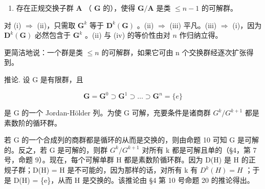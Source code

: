 \begin{enumerate}
\def\labelenumi{(\roman{enumi})}
\setcounter{enumi}{3}
\tightlist
\item
  存在正规交换子群 \(\mathbf{A}\) （ \(\mathbf{G}\) 的），使得 \(\mathbf{G} / \mathbf{A}\) 是类 \(\leqslant n - 1\) 的可解群。
\end{enumerate}

对 (i) \(\Rightarrow\) (ii)，只需取 \(\mathbf{G}^k\) 等于 \(\mathbf{D}^k (\mathbf{G})\) 。(ii) \(\Rightarrow\) (iii) 平凡。(iii) \(\Rightarrow\) (i)，因为 \(\mathbf{D}^k (\mathbf{G})\) 必然包含于 \(\mathbf{G}^k\) 。(ii) 与 (iv) 的等价性由对 \(n\) 作归纳立得。

更简洁地说：一个群是类 \(\leqslant n\) 的可解群，如果它可由 n 个交换群经逐次扩张得到。

推论. 设 G 是有限群，且

\[
\mathbf {G} = \mathbf {G} ^ {0} \supset \mathbf {G} ^ {1} \supset \dots \supset \mathbf {G} ^ {n} = \{e \}
\]

是 G 的一个 Jordan-Hölder 列。为使 G 可解，充要条件是诸商群 \(G^{k}/G^{k+1}\) 都是素数阶的循环群。

若 G 的一个合成列的商群都是循环的从而是交换的，则由命题 10 可知 G 是可解的。反之，若 G 是可解的，则群 \(G^{k}/G^{k+1}\) 对所有 k 都是可解且单的（§4，第 7 号，命题 9）。现在，每个可解单群 H 都是素数阶循环群。因为 D(H) 是 H 的正规子群；D(H) = H 是不可能的，因为那样的话，对所有 k 有 \(D^{k}(H) = H\) ；于是 D(H) = \{e\}，从而 H 是交换的。该推论由 §4 第 10 号命题 20 的推论得出。


